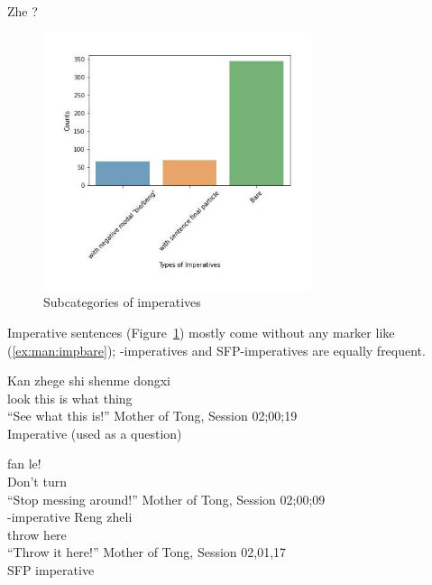 \bxl\label{ex:man:int:wh}
\gll Zhe ?\\

\ex\label{ex:man:int:anota}
\ex\label{ex:man:int:ma}
\ex\label{ex:man:int:haishi}
\exl
\eex

\begin{figure}[H]
    \centering
    \includegraphics[width=0.7\textwidth]{figures/man-real-subimp.jpg}
    \caption{Subcategories of imperatives}
    \label{fig:man:real-subimp}
\end{figure}

Imperative sentences (Figure~\ref{fig:man:real-subimp}) mostly come without any marker like (\ref{ex:man:impbare}); -imperatives and SFP-imperatives are equally frequent. 


\bxl\label{ex:man:impbare}
\gll Kan zhege shi shenme dongxi\\
look this is what thing\\
``See what this is!''  \hfill
Mother of Tong, Session 02;00;19\\
Imperative (used as a question)

\ex \label{ex:man:impbie}
\gll {} fan le!\\
Don't turn \Asp{}\\
``Stop messing around!'' \hfill Mother of Tong, Session 02;00;09\\
-imperative
\ex \label{ex:man:impba}
\gll Reng zheli \\
throw here \Sfp{}\\
\trans ``Throw it here!''
\hfill Mother of Tong, Session 02,01,17\\
SFP imperative
\exl
\eex

